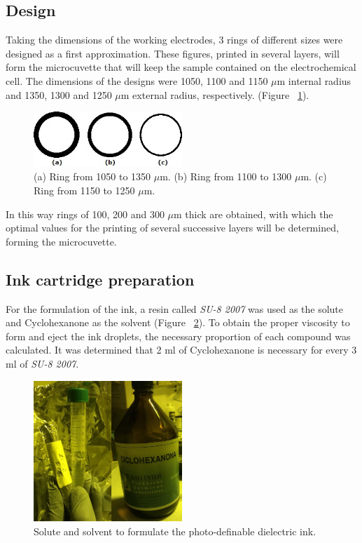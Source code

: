 \subsection{Design}
Taking the dimensions of the working electrodes, 3 rings of different sizes were designed as a first approximation. These figures, printed in several layers, will form the microcuvette that will keep the sample contained on the electrochemical cell. The dimensions of the designs were 1050, 1100 and 1150 $\mu$m internal radius and 1350, 1300 and 1250 $\mu$m external radius, respectively. (Figure ~\ref{fig:Figura_anillos_SU8}).

\begin{figure}[H]
  \centering
    \includegraphics[width=0.5\textwidth]{Figures/Figura_anillos_SU8}
  \caption{(a) Ring from 1050 to 1350 $\mu$m. (b) Ring from 1100 to 1300 $\mu$m. (c) Ring from 1150 to 1250 $\mu$m.}
  \label{fig:Figura_anillos_SU8}
\end{figure}

In this way rings of 100, 200 and 300 $\mu$m thick are obtained, with which the optimal values for the printing of several successive layers will be determined, forming the microcuvette.

\subsection{Ink cartridge preparation}
For the formulation of the ink, a resin called \textit{SU-8 2007} was used as the solute and Cyclohexanone as the solvent (Figure ~\ref{fig:Figura_SU8_Ciclohexanona}). To obtain the proper viscosity to form and eject the ink droplets, the necessary proportion of each compound was calculated. It was determined that 2 ml of Cyclohexanone is necessary for every 3 ml of \textit{SU-8 2007}.

\begin{figure}[H]
  \centering
    \includegraphics[width=0.5\textwidth]{Figures/Figura_SU8_Ciclohexanona}
  \caption{Solute and solvent to formulate the photo-definable dielectric ink.}
  \label{fig:Figura_SU8_Ciclohexanona}
\end{figure}

